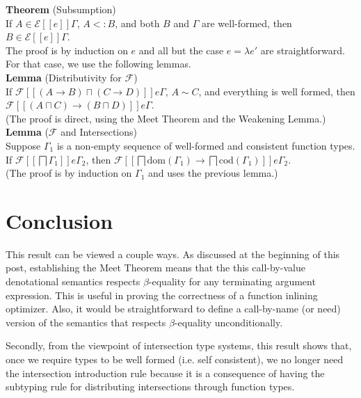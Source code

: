 \documentclass{article}
\newcommand{\SEM}[1]{[\![ #1 ]\!]}
\newcommand{\ESEM}[1]{\mathcal{E}\SEM{#1}}
\newcommand{\FSEM}[1]{\mathcal{F}\SEM{#1}}
\newcommand{\sqinter}[0]{\bigsqcap}
\begin{document}
\noindent \textbf{Theorem} (Subsumption)\\
If $A \in \ESEM{e}\Gamma$, $A <: B$, and both $B$ and $\Gamma$ are
well-formed, then $B \in \ESEM{e}\Gamma$. \\

\noindent The proof is by induction on $e$ and all but the case
$e=\lambda e'$ are straightforward. For that case, we use the
following lemmas.\\

\noindent \textbf{Lemma} (Distributivity for $\mathcal{F}$)\\
If $\FSEM{(A \to B)\sqcap (C \to D)} e \Gamma$,
$A \sim C$, and everything is well formed, then
$\FSEM{(A\sqcap C) \to (B\sqcap D)} e \Gamma$.\\
(The proof is direct, using the Meet Theorem
and the Weakening Lemma.)\\

\noindent \textbf{Lemma} ($\mathcal{F}$ and Intersections)\\
Suppose $\Gamma_1$ is a non-empty sequence of well-formed and
consistent function types.
If $\FSEM{\sqinter \Gamma_1} e \Gamma_2$, then
$\FSEM{\sqinter\mathrm{dom}(\Gamma_1) \to \sqinter \mathrm{cod}(\Gamma_1)}
e \Gamma_2$. \\
(The proof is by induction on $\Gamma_1$ and uses the previous lemma.)

\section{Conclusion}

This result can be viewed a couple ways. As discussed at the beginning
of this post, establishing the Meet Theorem means that the this
call-by-value denotational semantics respects $\beta$-equality for any
terminating argument expression. This is useful in proving the
correctness of a function inlining optimizer. Also, it would be
straightforward to define a call-by-name (or need) version of the
semantics that respects $\beta$-equality unconditionally.

Secondly, from the viewpoint of intersection type systems, this result
shows that, once we require types to be well formed (i.e. self
consistent), we no longer need the intersection introduction rule
because it is a consequence of having the subtyping rule for
distributing intersections through function types.
\end{document}
